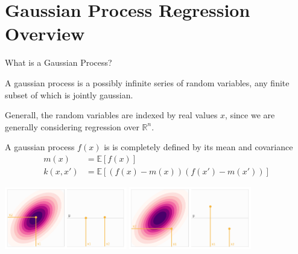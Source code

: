 \documentclass[10pt]{beamer}
\begin{document}
\section[GP Regression]{Gaussian Process Regression Overview}
\label{sec:gauss-proc-regr}

\begin{frame}{What is a Gaussian Process?}
  \begin{definition}
    A gaussian process is a possibly infinite series of random variables, any finite subset of which is jointly gaussian.
  \end{definition}


  Generall, the random variables are indexed by real values $x$, since we are generally considering regression over $\mathbb{R}^{n}$.

  A gaussian process $f(x)$ is is completely defined by its mean and covariance
  \begin{equation}
    \begin{split}
      m(x) &= \mathbb{E} \left[ f(x) \right] \\
      k(x,x') &= \mathbb{E} \left[ \left( f(x) - m(x) \right)  \left( f(x') - m(x') \right)\right] 
    \end{split}
  \end{equation}
% 

  \begin{center}
    \includegraphics[width=0.4\textwidth]{figures/two_points_1}
    \hspace{1cm}
    \includegraphics[width=0.4\textwidth]{figures/two_points_2}
  \end{center}
  
\end{frame}
\end{document}
